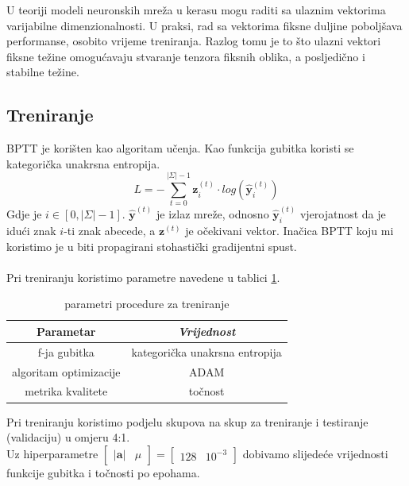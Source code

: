 \documentclass[conference]{IEEEtran}
\begin{document}
U teoriji modeli neuronskih mreža u kerasu mogu raditi sa ulaznim vektorima varijabilne dimenzionalnosti. U praksi, rad sa vektorima fiksne duljine poboljšava performanse, osobito vrijeme treniranja. Razlog tomu je to što ulazni vektori fiksne težine omogućavaju stvaranje tenzora fiksnih oblika, a posljedično i stabilne težine.\\



\subsection{Treniranje} \label{subsect:trening}
BPTT je korišten kao algoritam učenja.
Kao funkcija gubitka koristi se kategorička unakrsna entropija.
\begin{equation}
L = - \sum_{t = 0}^{\lvert \Sigma \rvert-1} \mathbf{z}_i^{(t)} \cdot log(\hat{\mathbf{y}}_i^{(t)})
\end{equation}
Gdje je $i \in [0, \lvert \Sigma \rvert - 1]$. $\hat{\mathbf{y}}^{(t)}$ je izlaz mreže, odnosno $\hat{\mathbf{y}}_i^{(t)}$ vjerojatnost da je idući znak $i$-ti znak abecede, a $\mathbf{z}^{(t)}$ je očekivani vektor.
Inačica BPTT koju mi koristimo je u biti propagirani stohastički gradijentni spust.\\
\\
Pri treniranju koristimo parametre navedene u tablici \ref{tab:trening}.
\begin{table}[htbp]
\caption{parametri procedure za treniranje}
\begin{center}
\begin{tabular}{|c|c|}
\hline
\textbf{Parametar} & \textbf{\textit{Vrijednost}}\\ \hline
f-ja gubitka & kategorička unakrsna entropija \\ \hline
algoritam optimizacije & ADAM \\ \hline
metrika kvalitete & točnost \\ \hline
\end{tabular}
\label{tab:trening}
\end{center}
\end{table}

Pri treniranju koristimo podjelu skupova na skup za treniranje i testiranje (validaciju) u omjeru 4:1.\\
Uz hiperparametre $\begin{bmatrix} \lvert \mathbf{a} \rvert & \mu\end{bmatrix} = \begin{bmatrix} 128 & 10^{-3}  \end{bmatrix}$ dobivamo slijedeće vrijednosti funkcije gubitka i točnosti po epohama.
\end{document}
